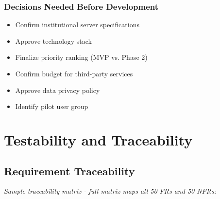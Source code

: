 \documentclass[12pt,a4paper]{report}
\begin{document}
\subsection{Decisions Needed Before Development}
\begin{itemize}
    \item Confirm institutional server specifications
    \item Approve technology stack
    \item Finalize priority ranking (MVP vs. Phase 2)
    \item Confirm budget for third-party services
    \item Approve data privacy policy
    \item Identify pilot user group
\end{itemize}

\chapter{Testability and Traceability}

\section{Requirement Traceability}

\textit{Sample traceability matrix - full matrix maps all 50 FRs and 50 NFRs:}
\end{document}
